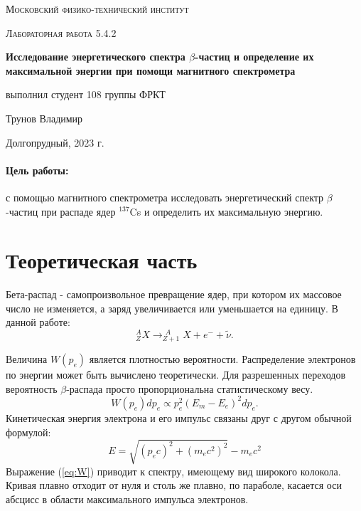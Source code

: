 \documentclass[a4paper, 12pt]{article}
\begin{document}
	
\begin{titlepage}
	\centering
	\vspace{5cm}
	{\scshape\LARGE Московский физико-технический институт \par}
	\vspace{4cm}
	{\scshape\Large Лабораторная работа 5.4.2 \par}
	\vspace{1cm}
	{\huge\bfseries Исследование энергетического спектра $\beta$-частиц и определение их максимальной энергии при помощи магнитного спектрометра \par}
	\vspace{1cm}
	\vfill
\begin{flushright}
	{\large выполнил студент 108 группы ФРКТ}\par
	\vspace{0.3cm}
	{\LARGE Трунов Владимир}
\end{flushright}
	

	\vfill

	Долгопрудный, 2023  г.
\end{titlepage}

\paragraph*{Цель работы:} с помощью магнитного спектрометра исследовать энергетический спектр $\beta$-частиц при распаде ядер $^{137}$Cs и определить их максимальную энергию.

\section*{Теоретическая часть}
	
	Бета-распад - самопроизвольное превращение ядер, при котором их массовое число не изменяется, а заряд увеличивается или уменьшается на единицу.
	В данной работе:
	$$^A_Z X \to ^{\ \, A}_{Z+1} X + e^- + \widetilde{\nu} .$$
	
	Величина $W(p_e)$ является плотностью вероятности. Распределение электронов по энергии может быть вычислено теоретически. Для разрешенных переходов вероятность $\beta$-распада просто пропорциональна статистическому весу.
	\begin{equation*}
		\label{eq:W}
		W(p_e)dp_e \propto p_e^2(E_m-E_e)^2 dp_e.
	\end{equation*}
	Кинетическая энергия электрона и его импульс связаны друг с другом обычной формулой:
	\begin{equation*}
		E = \sqrt{(p_ec)^2+(m_ec^2)^2}-m_ec^2
	\end{equation*}
	Выражение (\ref{eq:W}) приводит к спектру, имеющему вид широкого колокола. Кривая плавно отходит от нуля и столь же плавно, по параболе, касается оси абсцисс в области максимального импульса электронов.
	
\end{document}
